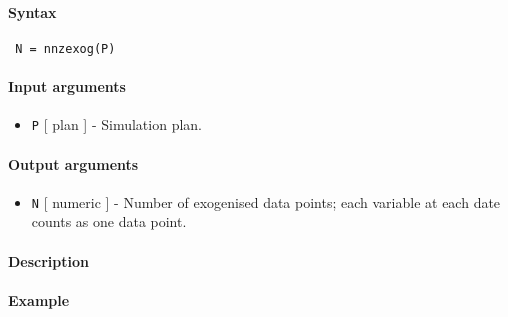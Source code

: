 


	\paragraph{Syntax}
 
 \begin{verbatim}
 N = nnzexog(P)
 \end{verbatim}
 
 \paragraph{Input arguments}
 
 \begin{itemize}
 \item
   \texttt{P} {[} plan {]} - Simulation plan.
 \end{itemize}
 
 \paragraph{Output arguments}
 
 \begin{itemize}
 \item
   \texttt{N} {[} numeric {]} - Number of exogenised data points; each
   variable at each date counts as one data point.
 \end{itemize}
 
 \paragraph{Description}
 
 \paragraph{Example}


